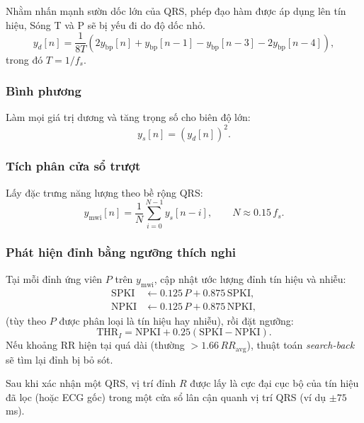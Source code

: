 \documentclass[../DoAn.tex]{subfiles}
\begin{document}
Nhằm nhấn mạnh sườn dốc lớn của QRS, phép đạo hàm được áp dụng lên tín hiệu, Sóng T và P sẽ bị yếu đi do độ dốc nhỏ.
\begin{equation}
  y_d[n] = \frac{1}{8T}\left(2y_{\mathrm{bp}}[n] + y_{\mathrm{bp}}[n-1] - y_{\mathrm{bp}}[n-3] - 2y_{\mathrm{bp}}[n-4]\right),
\end{equation}
trong đó $T=1/f_s$.

\subsubsection{Bình phương}

Làm mọi giá trị dương và tăng trọng số cho biên độ lớn:
\begin{equation}
  y_s[n] = \left(y_d[n]\right)^2.
\end{equation}

\subsubsection{Tích phân cửa sổ trượt}

Lấy đặc trưng năng lượng theo bề rộng QRS:
\begin{equation}
  y_{\mathrm{mwi}}[n] = \frac{1}{N}\sum_{i=0}^{N-1} y_s[n-i], \qquad N \approx 0.15\,f_s.
\end{equation}

\subsubsection{Phát hiện đỉnh bằng ngưỡng thích nghi}

Tại mỗi đỉnh ứng viên $P$ trên $y_{\mathrm{mwi}}$, cập nhật ước lượng đỉnh tín hiệu và nhiễu:
\begin{align}
  \mathrm{SPKI} &\leftarrow 0.125\,P + 0.875\,\mathrm{SPKI},\\
  \mathrm{NPKI} &\leftarrow 0.125\,P + 0.875\,\mathrm{NPKI},
\end{align}
(tùy theo $P$ được phân loại là tín hiệu hay nhiễu), rồi đặt ngưỡng:
\begin{equation}
  \mathrm{THR}_I = \mathrm{NPKI} + 0.25\left(\mathrm{SPKI}-\mathrm{NPKI}\right).
\end{equation}
Nếu khoảng RR hiện tại quá dài (thường $>1.66\,RR_{\mathrm{avg}}$), thuật toán \textit{search-back} sẽ tìm lại đỉnh bị bỏ sót.

Sau khi xác nhận một QRS, vị trí đỉnh $R$ được lấy là cực đại cục bộ của tín hiệu đã lọc (hoặc ECG gốc) trong một cửa sổ lân cận quanh vị trí QRS (ví dụ $\pm 75$ ms).
\end{document}
